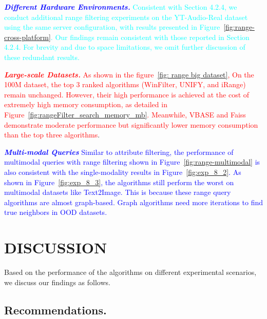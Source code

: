 \documentclass[sigconf, nonacm]{acmart}
\begin{document}
	\textit{\textbf{\textcolor{blue}{Different Hardware Environments.}}}
	\textcolor{cyan}{Consistent with Section 4.2.4, we conduct additional range filtering experiments on the YT-Audio-Real dataset using the same server configuration, with results presented in Figure~\ref{fig:range-cross-platform}. Our findings remain consistent with those reported in Section 4.2.4. For brevity and due to space limitations, we omit further discussion of these redundant results.}
	
	\textit{\textbf{\textcolor{red}{Large-scale Datasets.}}} \textcolor{red}{As shown in the figure~\ref{fig: range big dataset}, On the 100M dataset, the top 3 ranked algorithms (WinFilter, UNIFY, and iRange) remain unchanged. However, their high performance is achieved at the cost of extremely high memory consumption, as detailed in Figure~\ref{fig:rangeFilter_search_memory_mb}. Meanwhile, VBASE and Faiss demonstrate moderate performance but significantly lower memory consumption than the top three algorithms}.
	
	\textit{\textbf{\textcolor{blue}{Multi-modal Queries}}}
	\textcolor{blue}{
	Similar to attribute filtering, the performance of multimodal queries with range filtering shown in Figure~\ref{fig:range-multimodal} is also consistent with the single-modality results in Figure~\ref{fig:exp_8_2}. As shown in Figure~\ref{fig:exp_8_3}, the algorithms still perform the worst on multimodal datasets like Text2Image. This is because these range query algorithms are almost graph-based. Graph algorithms need more iterations to find true neighbors in OOD datasets.}
	
	\section{DISCUSSION}
	Based on the performance of the algorithms on different experimental scenarios, we discuss our findings as follows.
	
	
	\subsection{Recommendations.}
	
\end{document}
